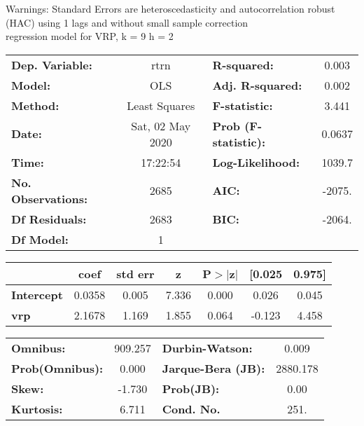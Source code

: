 Warnings: \newline
 [1] Standard Errors are heteroscedasticity and autocorrelation robust (HAC) using 1 lags and without small sample correction\\ 

regression model for VRP, k = 9 h = 2\begin{center}
\begin{tabular}{lclc}
\toprule
\textbf{Dep. Variable:}    &       rtrn       & \textbf{  R-squared:         } &     0.003   \\
\textbf{Model:}            &       OLS        & \textbf{  Adj. R-squared:    } &     0.002   \\
\textbf{Method:}           &  Least Squares   & \textbf{  F-statistic:       } &     3.441   \\
\textbf{Date:}             & Sat, 02 May 2020 & \textbf{  Prob (F-statistic):} &   0.0637    \\
\textbf{Time:}             &     17:22:54     & \textbf{  Log-Likelihood:    } &    1039.7   \\
\textbf{No. Observations:} &        2685      & \textbf{  AIC:               } &    -2075.   \\
\textbf{Df Residuals:}     &        2683      & \textbf{  BIC:               } &    -2064.   \\
\textbf{Df Model:}         &           1      & \textbf{                     } &             \\
\bottomrule
\end{tabular}
\begin{tabular}{lcccccc}
                   & \textbf{coef} & \textbf{std err} & \textbf{z} & \textbf{P$> |$z$|$} & \textbf{[0.025} & \textbf{0.975]}  \\
\midrule
\textbf{Intercept} &       0.0358  &        0.005     &     7.336  &         0.000        &        0.026    &        0.045     \\
\textbf{vrp}       &       2.1678  &        1.169     &     1.855  &         0.064        &       -0.123    &        4.458     \\
\bottomrule
\end{tabular}
\begin{tabular}{lclc}
\textbf{Omnibus:}       & 909.257 & \textbf{  Durbin-Watson:     } &    0.009  \\
\textbf{Prob(Omnibus):} &   0.000 & \textbf{  Jarque-Bera (JB):  } & 2880.178  \\
\textbf{Skew:}          &  -1.730 & \textbf{  Prob(JB):          } &     0.00  \\
\textbf{Kurtosis:}      &   6.711 & \textbf{  Cond. No.          } &     251.  \\
\bottomrule
\end{tabular}
\end{center}

